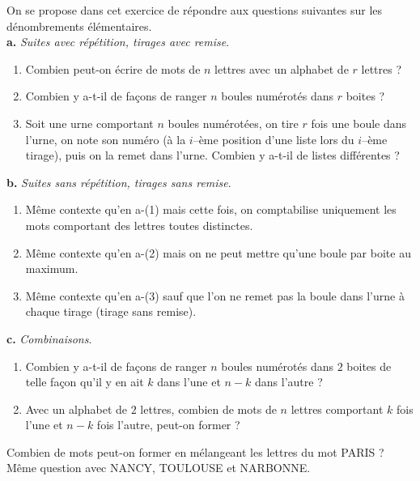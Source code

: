 \begin{exo} 
On se propose dans cet exercice de répondre aux questions suivantes sur 
les dénombrements élémentaires.
\\
\textbf{a.}
{\sl Suites avec répétition, tirages avec remise}.
      \begin{enumerate}
      \item Combien peut-on écrire de mots de $n$ lettres avec un alphabet 
            de $r$ lettres ?
      \item Combien y a-t-il de façons de ranger $n$ boules numérotés dans $r$
            boites ?
      \item Soit une urne comportant $n$ boules numérotées, 
            on tire $r$ fois une boule dans l'urne, on note son numéro (à la $i$--ème 
            position d'une liste lors du $i$--ème tirage), puis on la remet dans
            l'urne. Combien y a-t-il de listes différentes ?
      \end{enumerate}
\textbf{b.} 
{\sl Suites sans répétition, tirages sans remise}.
      \begin{enumerate}
      \item Même contexte qu'en a-(1) mais cette fois, on comptabilise uniquement
            les mots comportant des lettres toutes distinctes.
      \item Même contexte qu'en a-(2) mais on ne peut mettre qu'une boule par boite
            au maximum.
      \item Même contexte qu'en a-(3) sauf que l'on ne remet pas la boule
            dans l'urne à chaque tirage (tirage sans remise).
      \end{enumerate}
\textbf{c.} 
{\sl Combinaisons}.
      \begin{enumerate}
      \item Combien y a-t-il de façons de ranger $n$ boules numérotés dans $2$
            boites de telle façon qu'il y en ait $k$ dans l'une et $n-k$ dans l'autre ?
      \item Avec un alphabet de $2$ lettres, combien de mots de $n$ lettres  
            comportant $k$ fois l'une et $n-k$ fois l'autre, peut-on former ?
      \end{enumerate}
\end{exo}



\begin{exo}
Combien de mots peut-on former en m\'elangeant les lettres du mot PARIS ? M\^eme question avec NANCY, TOULOUSE et NARBONNE.
\end{exo}


